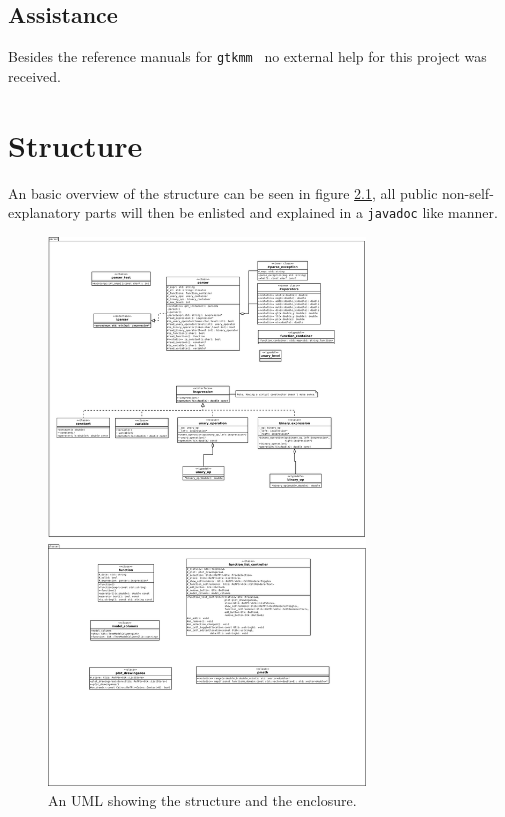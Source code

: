 \documentclass[a4paper,11pt]{kth-mag}
\newcommand{\Gtkmm}{\texttt{gtkmm}}
\begin{document}
\section{Assistance}
Besides the reference manuals for \Gtkmm ~ no external help for this project was
received.

\chapter{Structure}
An basic overview of the structure can be seen in figure \ref{fig:UML}, all
public non-self-explanatory parts will then be enlisted and explained in 
a \verb+javadoc+ like manner.
\begin{figure}[ht]
\begin{center}
    \includegraphics[width=0.75\textwidth]{uml.pdf}
    \caption{\small{An UML showing the structure and the enclosure.}}\label{fig:UML}
\end{center}
\end{figure}
\end{document}
